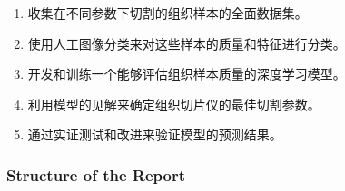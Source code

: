\begin{enumerate}
\item 收集在不同参数下切割的组织样本的全面数据集。
\item 使用人工图像分类来对这些样本的质量和特征进行分类。
\item 开发和训练一个能够评估组织样本质量的深度学习模型。
\item 利用模型的见解来确定组织切片仪的最佳切割参数。
\item 通过实证测试和改进来验证模型的预测结果。
\end{enumerate}

\subsubsection{Structure of the Report}




